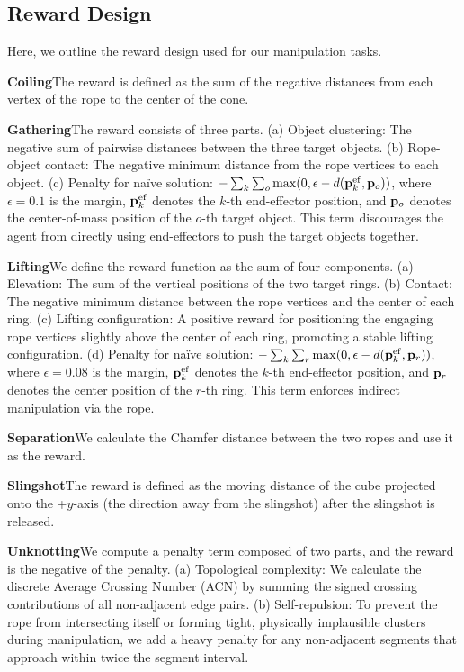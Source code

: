 \subsection{Reward Design}
\label{sec:reward_design}
Here, we outline the reward design used for our manipulation tasks.

\textbf{Coiling}\quad The reward is defined as the sum of the negative distances from each vertex of the rope to the center of the cone.

\textbf{Gathering}\quad The reward consists of three parts. (a) Object clustering: The negative sum of pairwise distances between the three target objects. (b) Rope-object contact: The negative minimum distance from the rope vertices to each object. (c) Penalty for naïve solution: $-\sum_{k}\sum_o\max (0, \epsilon-d({\mathbf{p}}^\mathrm{ef}_k, {\mathbf{p}}_o))$, where $\epsilon=0.1$ is the margin, ${\mathbf{p}}^\mathrm{ef}_k$ denotes the $k$-th end-effector position, and ${\mathbf{p}}_o$ denotes the center-of-mass position of the $o$-th target object. This term discourages the agent from directly using end-effectors to push the target objects together.

\textbf{Lifting}\quad We define the reward function as the sum of four components. (a) Elevation: The sum of the vertical positions of the two target rings. (b) Contact: The negative minimum distance between the rope vertices and the center of each ring. (c) Lifting configuration: A positive reward for positioning the engaging rope vertices slightly above the center of each ring, promoting a stable lifting configuration. (d) Penalty for naïve solution: $-\sum_{k}\sum_r\max (0, \epsilon-d({\mathbf{p}}^\mathrm{ef}_k, {\mathbf{p}}_r))$, where $\epsilon=0.08$ is the margin, ${\mathbf{p}}^\mathrm{ef}_k$ denotes the $k$-th end-effector position, and ${\mathbf{p}}_r$ denotes the center position of the $r$-th ring. This term enforces indirect manipulation via the rope.

\textbf{Separation}\quad We calculate the Chamfer distance between the two ropes and use it as the reward.

\textbf{Slingshot}\quad The reward is defined as the moving distance of the cube projected onto the +$y$-axis (the direction away from the slingshot) after the slingshot is released.

\textbf{Unknotting}\quad We compute a penalty term composed of two parts, and the reward is the negative of the penalty. (a) Topological complexity: We calculate the discrete Average Crossing Number (ACN) by summing the signed crossing contributions of all non-adjacent edge pairs. (b) Self-repulsion: To prevent the rope from intersecting itself or forming tight, physically implausible clusters during manipulation, we add a heavy penalty for any non-adjacent segments that approach within twice the segment interval.

